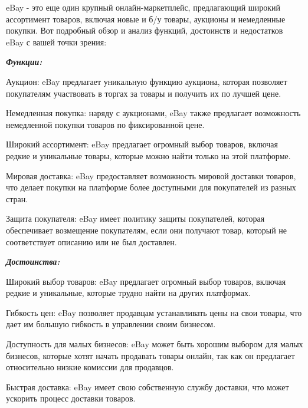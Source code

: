 eBay - это еще один крупный онлайн-маркетплейс, предлагающий широкий ассортимент товаров, включая новые и б/у товары, аукционы и немедленные покупки. Вот подробный обзор и анализ функций, достоинств и недостатков eBay с вашей точки зрения:

\textbf{\emph{Функции:}}

\begin{compactitem}
    \item  Аукцион: eBay предлагает уникальную функцию аукциона, которая позволяет покупателям участвовать в торгах за товары и получить их по лучшей цене.

    \item  Немедленная покупка: наряду с аукционами, eBay также предлагает возможность немедленной покупки товаров по фиксированной цене.

    \item  Широкий ассортимент: eBay предлагает огромный выбор товаров, включая редкие и уникальные товары, которые можно найти только на этой платформе.

    \item  Мировая доставка: eBay предоставляет возможность мировой доставки товаров, что делает покупки на платформе более доступными для покупателей из разных стран.

    \item  Защита покупателя: eBay имеет политику защиты покупателей, которая обеспечивает возмещение покупателям, если они получают товар, который не соответствует описанию или не был доставлен.
\end{compactitem}

\textbf{\emph{Достоинства:}}

\begin{compactitem}
    \item  Широкий выбор товаров: eBay предлагает огромный выбор товаров, включая редкие и уникальные, которые трудно найти на других платформах.

    \item  Гибкость цен: eBay позволяет продавцам устанавливать цены на свои товары, что дает им большую гибкость в управлении своим бизнесом.

    \item  Доступность для малых бизнесов: eBay может быть хорошим выбором для малых бизнесов, которые хотят начать продавать товары онлайн, так как он предлагает относительно низкие комиссии для продавцов.

    \item  Быстрая доставка: eBay имеет свою собственную службу доставки, что может ускорить процесс доставки товаров.
\end{compactitem}

